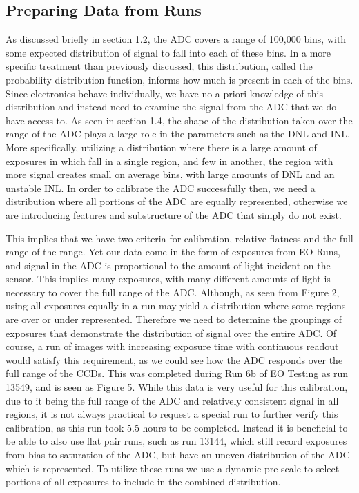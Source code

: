 \documentclass[11pt, letterpaper]{article}
\begin{document}
\subsection{Preparing Data from Runs}
\indent


As discussed briefly in section 1.2, the ADC covers a range of 100,000 bins, with some expected distribution of signal to fall into each of these bins. 
In a more specific treatment than previously discussed, this distribution, called the probability distribution function, informs how much is present in each of the bins. 
Since electronics behave individually, we have no a-priori knowledge of this distribution and instead need to examine the signal from the ADC that we do have access to. 
As seen in section 1.4, the shape of the distribution taken over the range of the ADC plays a large role in the parameters such as the DNL and INL.
More specifically, utilizing a distribution where there is a large amount of exposures in which fall in a single region, and few in another, the region with more signal creates small on average bins, with large amounts of DNL and an unstable INL. 
In order to calibrate the ADC successfully then, we need a distribution where all portions of the ADC are equally represented, otherwise we are introducing features and substructure of the ADC that simply do not exist. 
\indent 


This implies that we have two criteria for calibration, relative flatness and the full range of the range. 
Yet our data come in the form of exposures from EO Runs, and signal in the ADC is proportional to the amount of light incident on the sensor. 
This implies many exposures, with many different amounts of light is necessary to cover the full range of the ADC. 
Although, as seen from Figure 2, using all exposures equally in a run may yield a distribution where some regions are over or under represented. 
Therefore we need to determine the groupings of exposures that demonstrate the distribution of signal over the entire ADC. 
Of course, a run of images with increasing exposure time with continuous readout would satisfy this requirement, as we could see how the ADC responds over the full range of the CCDs. 
This was completed during Run 6b of EO Testing as run 13549, and is seen as Figure 5.
While this data is very useful for this calibration, due to it being the full range of the ADC and relatively consistent signal in all regions, it is not always practical to request a special run to further verify this calibration, as this run took 5.5 hours to be completed.
Instead it is beneficial to be able to also use flat pair runs, such as run 13144, which still record exposures from bias to saturation of the ADC, but have an uneven distribution of the ADC which is represented. 
To utilize these runs we use a dynamic pre-scale to select portions of all exposures to include in the combined distribution. 
\end{document}
